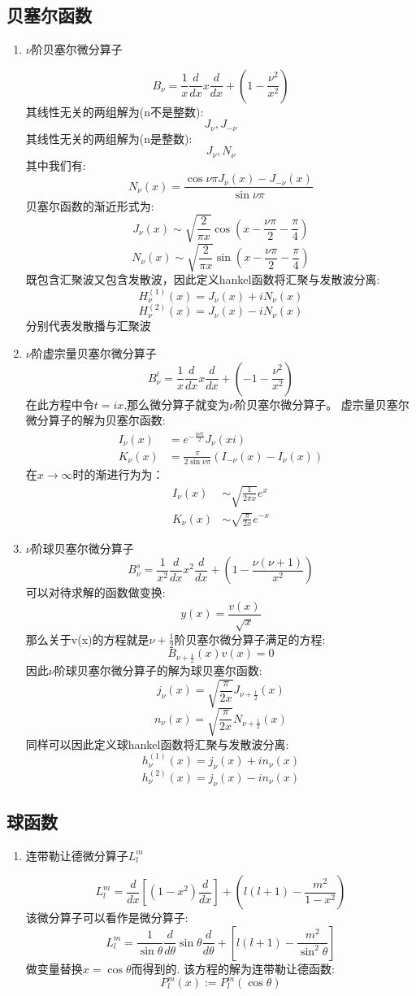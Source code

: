 \subsection{贝塞尔函数}
\begin{enumerate}
\item{$\nu$阶贝塞尔微分算子\par}
\[B_\nu=\frac{1}{x}\frac{d}{dx}x\frac{d}{dx}+(1-\frac{\nu^2}{x^2})\]
其线性无关的两组解为(n不是整数):
\[J_\nu,J_{-\nu}\]
其线性无关的两组解为(n是整数):
\[J_\nu,N_{\nu}\]
其中我们有:
\[N_{\nu}(x)=\frac{\cos \nu \pi J_\nu(x)-J_{-\nu}(x)}{\sin\nu\pi}\]
贝塞尔函数的渐近形式为:
\[J_\nu(x)\sim \sqrt{\frac{2}{\pi x}}\cos(x-\frac{\nu\pi}{2}-\frac{\pi}{4})\]
\[N_\nu(x)\sim \sqrt{\frac{2}{\pi x}}\sin(x-\frac{\nu\pi}{2}-\frac{\pi}{4})\]
既包含汇聚波又包含发散波，因此定义hankel函数将汇聚与发散波分离:
\[H_\nu^{(1)}(x)=J_\nu(x)+iN_\nu(x)\]
\[H_\nu^{(2)}(x)=J_\nu(x)-iN_\nu(x)\]
分别代表发散播与汇聚波\par\vspace{10pt}
\item{$\nu$阶虚宗量贝塞尔微分算子}
\[B^i_\nu=\frac{1}{x}\frac{d}{dx}x\frac{d}{dx}+(-1-\frac{\nu^2}{x^2})\]
在此方程中令$t=ix$,那么微分算子就变为$\nu$阶贝塞尔微分算子。
虚宗量贝塞尔微分算子的解为贝塞尔函数:
\begin{align*}
I_\nu(x)&=e^{-\frac{i\nu\pi}{2}}J_\nu(xi)\\
K_\nu(x)&=\frac{\pi}{2\sin\nu\pi}(I_{-\nu}(x)-I_\nu(x))
\end{align*}
在$x\rightarrow \infty$时的渐进行为为：
\begin{align*}
I_\nu(x)&\sim \sqrt{\frac{1}{2\pi x}}e^x\\
K_\nu(x)&\sim \sqrt{\frac{\pi}{2 x}}e^{-x}
\end{align*}
\item{$\nu$阶球贝塞尔微分算子}
\[B^s_\nu=\frac{1}{x^2}\frac{d}{dx}x^2\frac{d}{dx}+(1-\frac{\nu(\nu+1)}{x^2})\]
可以对待求解的函数做变换:
\[y(x)=\frac{v(x)}{\sqrt{x}}\]
那么关于v(x)的方程就是$\nu+\frac{1}{2}$阶贝塞尔微分算子满足的方程:
\[B_{\nu+\frac{1}{2}}(x)v(x)=0\]
因此$\nu$阶球贝塞尔微分算子的解为球贝塞尔函数:
\[j_\nu(x)=\sqrt{\frac{\pi}{2x}}J_{\nu+\frac{1}{2}}(x)\]
\[n_\nu(x)=\sqrt{\frac{\pi}{2x}}N_{\nu+\frac{1}{2}}(x)\]
同样可以因此定义球hankel函数将汇聚与发散波分离:
\[h_\nu^{(1)}(x)=j_\nu(x)+in_\nu(x)\]
\[h_\nu^{(2)}(x)=j_\nu(x)-in_\nu(x)\]
\end{enumerate}

\subsection{球函数}
\begin{enumerate}
\item{连带勒让德微分算子$L_l^m$\par}
\[L_l^m=\frac{d}{dx}[(1-x^2)\frac{d}{dx}]+(l(l+1)-\frac{m^2}{1-x^2})\]
该微分算子可以看作是微分算子:
\[L_l^m=\frac{1}{\sin\theta}\frac{d}{d\theta}\sin\theta\frac{d}{d\theta}+[l(l+1)-\frac{m^2}{\sin^2\theta}]\]
做变量替换$x=\cos\theta$而得到的.
该方程的解为连带勒让德函数:
\[P_l^m(x):=P_l^m(\cos\theta)\]
\end{enumerate}
